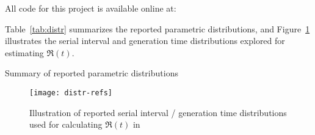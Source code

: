 All code for this project is available online at:\\
\par
Table~\ref{tab:distr} summarizes
the reported parametric \covid distributions, and
Figure~\ref{fig:distr-refs} illustrates
the serial interval and generation time distributions
explored for estimating $\Re(t)$.
\par
\begin{table}[h]
  \centering
  \caption{Summary of reported parametric \covid distributions}
  
  \label{tab:distr}
\end{table}
\par
\begin{figure}[h]
  \centering
  \texttt{[image: distr-refs]}
  \caption{Illustration of reported serial interval / generation time
    distributions used for calculating $\Re(t)$ in \covid}
  \label{fig:distr-refs}
\end{figure}